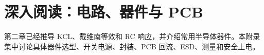 \chapter{深入阅读：电路、器件与 PCB}

第二章已经推导 KCL、戴维南等效和 RC 响应，并介绍常用半导体器件。本附录
集中讨论具体器件选型、开关电源、封装、PCB 回流、ESD、测量和安全上电。

\maybeskip


